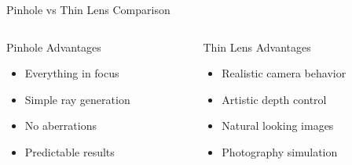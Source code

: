 \begin{frame}{Pinhole vs Thin Lens Comparison}
\begin{center}
    \end{center}

    \vspace{0.5cm}
    \begin{columns}
        \begin{column}{0.5\textwidth}
            \begin{raybox}{Pinhole Advantages}
                \begin{itemize}
                    \item Everything in focus
                    \item Simple ray generation
                    \item No aberrations
                    \item Predictable results
                \end{itemize}
            \end{raybox}
        \end{column}
        \begin{column}{0.5\textwidth}
            \begin{raybox}{Thin Lens Advantages}
                \begin{itemize}
                    \item Realistic camera behavior
                    \item Artistic depth control
                    \item Natural looking images
                    \item Photography simulation
                \end{itemize}
            \end{raybox}
        \end{column}
    \end{columns}
\end{frame}

